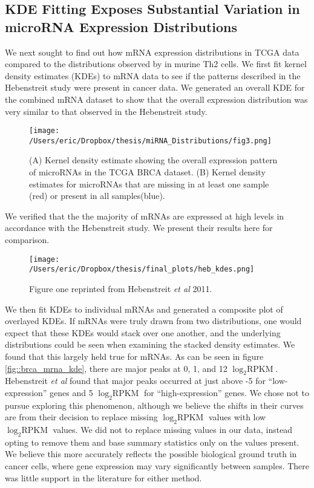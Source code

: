 \documentclass[12pt]{report}
\begin{document}


\subsection*{KDE Fitting Exposes Substantial Variation in microRNA Expression Distributions}
We next sought to find out how mRNA expression distributions in TCGA data compared to the distributions observed by \cite{Hebenstreit2011} in murine Th2 cells. We first fit kernel density estimates (KDEs) to 
mRNA data to see if the patterns described in the Hebenstreit study were present in cancer data. We generated an overall KDE for the combined mRNA dataset to show
that the overall expression distribution was very similar to that observed in the Hebenstreit study.

\begin{figure}[H]
\centering
 \texttt{[image: /Users/eric/Dropbox/thesis/miRNA\_Distributions/fig3.png]}
 \caption{(A) Kernel density estimate showing the overall expression pattern of microRNAs in the TCGA
 BRCA dataset. (B) Kernel density estimates for microRNAs that are missing in at least one sample (red) or present
 in all samples(blue).}
 \label{fig::brca_mrna_overall_kde}
\end{figure}

We verified that the the majority of mRNAs are expressed at high levels in accordance with the Hebenstreit study.  We present their results here for comparison.

\begin{figure}[H]
\centering
 \texttt{[image: /Users/eric/Dropbox/thesis/final\_plots/heb\_kdes.png]}
 \caption{Figure one reprinted from Hebenstreit \textit{et al } 2011.}
 \label{fig::brca_mrna_and_heb}
\end{figure}

We then fit KDEs to individual mRNAs and generated a composite plot of overlayed KDEs. If mRNAs were truly drawn from two distributions, one would expect that these
KDEs would stack over one another, and the underlying distributions could be seen when examining the stacked density estimates. We found that this largely held true for mRNAs.
As can be seen in figure \ref{fig::brca_mrna_kde}, there are major peaks at 0, 1, and 12 $\log_{2} \text{RPKM}$. Hebenstreit \textit{et al} found that major peaks occurred at just above -5 
for ``low-expression'' genes and 5 $\log_{2} \text{RPKM}$ for ``high-expression'' genes. We chose not to pursue exploring this phenomenon, although we believe the shifts in their curves
are from their decision to replace missing $\log_{2} \text{RPKM}$ values with low $\log_{2} \text{RPKM}$ values. We did not to replace missing values in our data, instead opting to remove them
and base summary statistics only on the values present. We believe this more accurately reflects the possible biological ground truth in cancer cells, where gene expression may vary
significantly between samples. There was little support in the literature for either method. %
\end{document}
